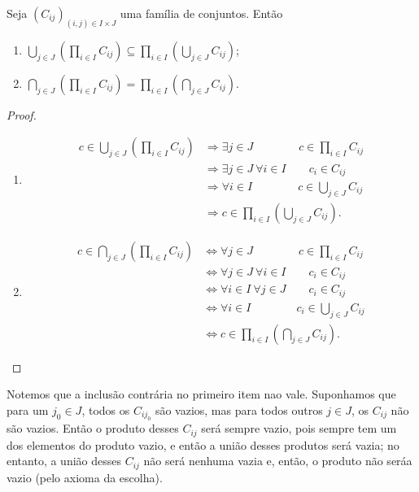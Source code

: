 \begin{prop}
	Seja $(C_{ij})_{(i,j) \in I \times J}$ uma família de conjuntos. Então
	\begin{enumerate}
	\item $\displaystyle \bigcup_{j \in J} \left(\prod_{i \in I} C_{ij}\right) \subseteq \prod_{i \in I} \left(\bigcup_{j \in J} C_{ij}\right)$;
	\item $\displaystyle \bigcap_{j \in J} \left(\prod_{i \in I} C_{ij}\right) = \prod_{i \in I} \left(\bigcap_{j \in J} C_{ij}\right)$.
	\end{enumerate}
\end{prop}
\begin{proof}
	\begin{enumerate}	
	\item \begin{align*}
	c \in \displaystyle \bigcup_{j \in J} \left(\prod_{i \in I} C_{ij}\right) & \Rightarrow \exists j \in J \qquad \qquad c \in \prod_{i \in I} C_{ij} \\
	& \Rightarrow \exists j \in J \ \forall i \in I \qquad c_i \in C_{ij} \\
	& \Rightarrow \forall i \in I \qquad \qquad c \in \bigcup_{j \in J} C_{ij} \\
	& \Rightarrow  c \in \prod_{i \in I} \left(\bigcup_{j \in J} C_{ij}\right).
	\end{align*}
	
	\item 	
	\begin{align*}
	c \in \displaystyle \bigcap_{j \in J} \left(\prod_{i \in I} C_{ij}\right) & \Leftrightarrow \forall j \in J \qquad \qquad c \in \prod_{i \in I} C_{ij} \\
	& \Leftrightarrow \forall j \in J \ \forall i \in I \qquad c_i \in C_{ij} \\
	& \Leftrightarrow \forall i \in I \ \forall j \in J \qquad c_i \in C_{ij} \\
	& \Leftrightarrow \forall i \in I \qquad \qquad c_i \in \bigcup_{j \in J} C_{ij} \\
	& \Leftrightarrow  c \in \prod_{i \in I} \left(\bigcap_{j \in J} C_{ij}\right).
	\end{align*}
	\end{enumerate}
\end{proof}

Notemos que a inclusão contrária no primeiro item nao vale. Suponhamos que para um $j_0 \in J$, todos os $C_{ij_0}$ são vazios, mas para todos outros $j \in J$, os $C_{ij}$ não são vazios. Então o produto desses $C_{ij}$ será sempre vazio, pois sempre tem um dos elementos do produto vazio, e então a união desses produtos será vazia; no entanto, a união desses $C_{ij}$ não será nenhuma vazia e, então, o produto não seráa vazio (pelo axioma da escolha).


